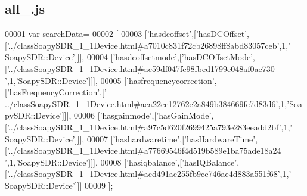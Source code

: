 \subsection{all\+\_.\+js}
\label{all__7_8js_source}

\begin{DoxyCode}
00001 var searchData=
00002 [
00003   [\textcolor{stringliteral}{'hasdcoffset'},[\textcolor{stringliteral}{'hasDCOffset'},[\textcolor{stringliteral}{'../classSoapySDR\_1\_1Device.html#a7010c831f72cb26898ff8abd83057ceb'},1,\textcolor{stringliteral}{'
      SoapySDR::Device'}]]],
00004   [\textcolor{stringliteral}{'hasdcoffsetmode'},[\textcolor{stringliteral}{'hasDCOffsetMode'},[\textcolor{stringliteral}{'../classSoapySDR\_1\_1Device.html#ac59df047fc98fbed1799e048af0ae730
      '},1,\textcolor{stringliteral}{'SoapySDR::Device'}]]],
00005   [\textcolor{stringliteral}{'hasfrequencycorrection'},[\textcolor{stringliteral}{'hasFrequencyCorrection'},[\textcolor{stringliteral}{'
      ../classSoapySDR\_1\_1Device.html#aea22ee12762e2a849b384669fe7d83d6'},1,\textcolor{stringliteral}{'SoapySDR::Device'}]]],
00006   [\textcolor{stringliteral}{'hasgainmode'},[\textcolor{stringliteral}{'hasGainMode'},[\textcolor{stringliteral}{'../classSoapySDR\_1\_1Device.html#a97c5d620f2699425a793e283eeadd2bf'},1,\textcolor{stringliteral}{'
      SoapySDR::Device'}]]],
00007   [\textcolor{stringliteral}{'hashardwaretime'},[\textcolor{stringliteral}{'hasHardwareTime'},[\textcolor{stringliteral}{'../classSoapySDR\_1\_1Device.html#a77669546f4d519b589e1ba75ade18a24
      '},1,\textcolor{stringliteral}{'SoapySDR::Device'}]]],
00008   [\textcolor{stringliteral}{'hasiqbalance'},[\textcolor{stringliteral}{'hasIQBalance'},[\textcolor{stringliteral}{'../classSoapySDR\_1\_1Device.html#acd491ac255fb9cc746ae4d883a551f68'},1,\textcolor{stringliteral}{'
      SoapySDR::Device'}]]]
00009 ];
\end{DoxyCode}
